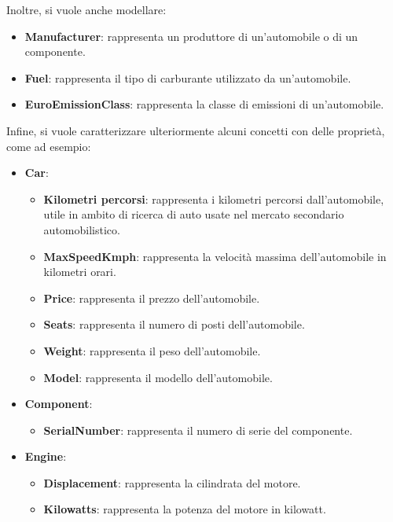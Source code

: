 Inoltre, si vuole anche modellare:\\

\begin{itemize}
    \item \textbf{Manufacturer}: rappresenta un produttore di un'automobile o di un componente.
    \item \textbf{Fuel}: rappresenta il tipo di carburante utilizzato da un'automobile.
    \item \textbf{EuroEmissionClass}: rappresenta la classe di emissioni di un'automobile.
\end{itemize}

Infine, si vuole caratterizzare ulteriormente alcuni concetti con delle proprietà, come ad esempio:

\begin{itemize}
    \item \textbf{Car}:
          \begin{itemize}
              \item \textbf{Kilometri percorsi}: rappresenta i kilometri percorsi dall'automobile, utile in ambito di ricerca di auto usate nel mercato secondario automobilistico.
              \item \textbf{MaxSpeedKmph}: rappresenta la velocità massima dell'automobile in kilometri orari.
              \item \textbf{Price}: rappresenta il prezzo dell'automobile.
              \item \textbf{Seats}: rappresenta il numero di posti dell'automobile.
              \item \textbf{Weight}: rappresenta il peso dell'automobile.
              \item \textbf{Model}: rappresenta il modello dell'automobile.
          \end{itemize}
    \item \textbf{Component}:
          \begin{itemize}
              \item \textbf{SerialNumber}: rappresenta il numero di serie del componente.
          \end{itemize}
    \item \textbf{Engine}:
          \begin{itemize}
              \item \textbf{Displacement}: rappresenta la cilindrata del motore.
              \item \textbf{Kilowatts}: rappresenta la potenza del motore in kilowatt.
          \end{itemize}
\end{itemize}